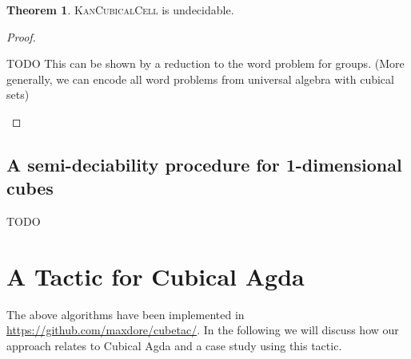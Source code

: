 \documentclass[11pt]{article}
\theoremstyle{definition}
\newtheorem{theorem}{Theorem}
\newcommand{\todo}[1]{
  \begin{tcolorbox}
    TODO {#1} 
  \end{tcolorbox}
}
\newcommand{\problem}[1]{\textsc{{#1}}}
\newcommand{\smap}[1]{s^{{#1}}}
\newcommand{\dmap}[2]{d^{({#1} , {#2})}}
\newcommand{\cset}[1]{\ensuremath{\mathsf{{#1}}}}
\begin{document}
\begin{theorem}
  \problem{KanCubicalCell} is undecidable.
  \begin{proof} \phantom{asdx}\\




    \todo{This can be shown by a reduction to the word problem for groups. (More
      generally, we can encode all word problems from universal algebra with
      cubical sets)
}
\end{proof}
\end{theorem}

\subsection{A semi-deciability procedure for 1-dimensional cubes}

\todo{}






\section{A Tactic for Cubical Agda}
\label{sec:cubicalagda}

The above algorithms have been implemented in
\url{https://github.com/maxdore/cubetac/}. In the following we will discuss how
our approach relates to Cubical Agda and a case study using this tactic.
\end{document}
